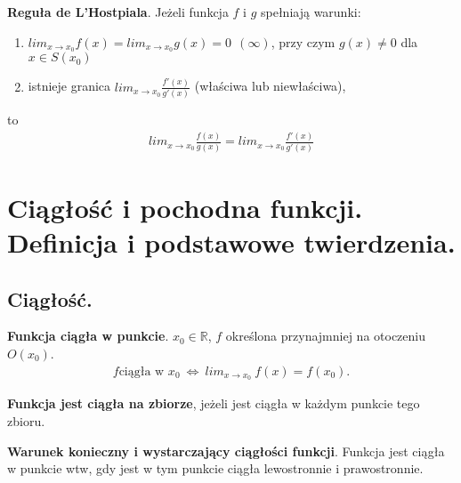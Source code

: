 \documentclass[main.tex]{subfiles}
\begin{document}
    \begin{theorem}
        \textbf{Reguła de L'Hostpiala}. Jeżeli funkcja $f$ i  $g$ spełniają warunki:
        \begin{enumerate}
            \item $lim_{x \rightarrow x_0} f(x) = lim_{x \rightarrow x_0} g(x) = 0 ~~ (\infty)$, przy czym $g(x) \neq 0$ dla $x \in S(x_0)$
            \item istnieje granica $lim_{x \rightarrow x_0} \frac{f'(x)}{g'(x)}$ (właściwa lub niewłaściwa),
        \end{enumerate}
        to
        \begin{align*}
            lim_{x \rightarrow x_0} \frac{f(x)}{g(x)} = lim_{x \rightarrow x_0} \frac{f'(x)}{g'(x)}
        \end{align*}
    \end{theorem}


    \section{Ciągłość i pochodna funkcji. Definicja i podstawowe twierdzenia.}

    \subsection{Ciągłość.}

    \begin{definition}
        \textbf{Funkcja ciągła w punkcie}. $x_0 \in \mathbb{R}$, $f$ określona przynajmniej na otoczeniu $O(x_0)$.
        \begin{align*}
            f \text{ciągła w }x_0 ~ \Leftrightarrow ~ lim_{x \rightarrow x_0} ~ f(x) = f(x_0).
        \end{align*}

        \textbf{Funkcja jest ciągła na zbiorze}, jeżeli jest ciągła w każdym punkcie tego zbioru.
    \end{definition}

    \begin{theorem}
        \textbf{Warunek konieczny i wystarczający ciągłości funkcji}. Funkcja jest ciągła w punkcie wtw,
        gdy jest w tym punkcie ciągła lewostronnie i prawostronnie.
    \end{theorem}
\end{document}
